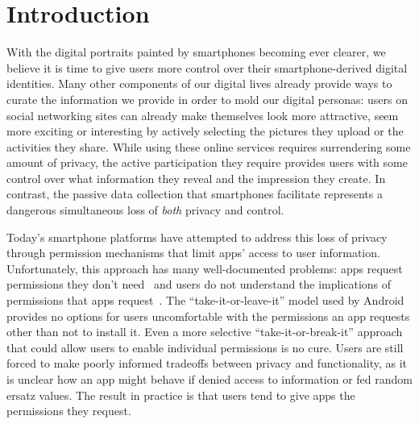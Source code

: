 
\section{Introduction} \label{sec-introduction}

With the digital portraits painted by smartphones becoming ever clearer, we
believe it is time to give users more control over their smartphone-derived
digital identities. Many other components of our digital lives already provide
ways to curate the information we provide in order to mold our digital
personas: users on social networking sites can already make themselves look
more attractive, seem more exciting or interesting by actively selecting
the pictures they upload or the activities they share. While using these
online services requires surrendering some amount of privacy, the active
participation they require provides users with some control over what
information they reveal and the impression they create. In contrast, the
passive data collection that smartphones facilitate represents a dangerous
simultaneous loss of \textit{both} privacy and control.


Today's smartphone platforms have attempted to address this loss of privacy
through permission mechanisms that limit apps' access to user information.
Unfortunately, this approach has many well-documented problems: apps request
permissions they don't need~\cite{taintdroid-osdi,demystified-ccs11} and users
do not understand the implications of permissions that apps
request~\cite{androidperms-soups12}. The ``take-it-or-leave-it'' model used by
Android provides no options for users uncomfortable with the permissions an app
requests other than not to install it. Even a more selective
``take-it-or-break-it'' approach~\cite{apex-asiaccs10} that could allow users to
enable individual permissions is no cure. Users are still
forced to make poorly informed tradeoffs between privacy and functionality, as
it is unclear how an app might behave if denied access to information or fed
random ersatz values. The result in practice is that users tend to give apps
the permissions they request.


